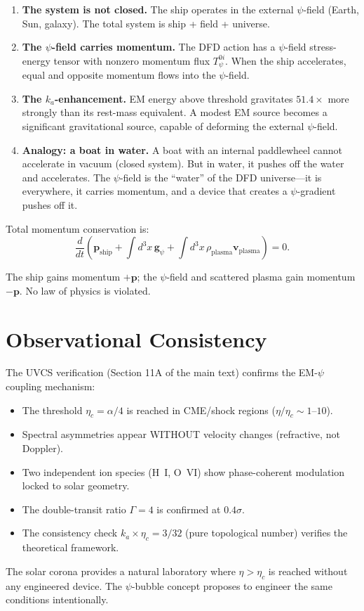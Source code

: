 \documentclass[12pt, letterpaper]{article}
\theoremstyle{definition}
\theoremstyle{remark}
\newcommand{\ka}{k_a}
\newcommand{\etac}{\eta_c}
\begin{document}
\begin{enumerate}
\item \textbf{The system is not closed.} The ship operates in the external
$\psi$-field (Earth, Sun, galaxy). The total system is ship + field + universe.

\item \textbf{The $\psi$-field carries momentum.} The DFD action has a
$\psi$-field stress-energy tensor with nonzero momentum flux $T^{0i}_\psi$.
When the ship accelerates, equal and opposite momentum flows into the
$\psi$-field.

\item \textbf{The $\ka$-enhancement.} EM energy above threshold gravitates
$51.4\times$ more strongly than its rest-mass equivalent. A modest EM
source becomes a significant gravitational source, capable of deforming
the external $\psi$-field.

\item \textbf{Analogy: a boat in water.} A boat with an internal
paddlewheel cannot accelerate in vacuum (closed system). But in water,
it pushes off the water and accelerates. The $\psi$-field is the ``water''
of the DFD universe---it is everywhere, it carries momentum, and a
device that creates a $\psi$-gradient pushes off it.
\end{enumerate}

Total momentum conservation is:
\begin{equation}
\frac{d}{dt}\left(\mathbf{p}_{\mathrm{ship}} + \int d^3x \, \mathbf{g}_\psi
+ \int d^3x \, \rho_{\mathrm{plasma}} \mathbf{v}_{\mathrm{plasma}}\right) = 0.
\end{equation}

The ship gains momentum $+\mathbf{p}$; the $\psi$-field and scattered
plasma gain momentum $-\mathbf{p}$. No law of physics is violated.

\section{Observational Consistency}

The UVCS verification (Section 11A of the main text) confirms the
EM-$\psi$ coupling mechanism:

\begin{itemize}
\item The threshold $\etac = \alpha/4$ is reached in CME/shock regions
($\eta/\etac \sim 1$--$10$).
\item Spectral asymmetries appear WITHOUT velocity changes (refractive,
not Doppler).
\item Two independent ion species (H~I, O~VI) show phase-coherent
modulation locked to solar geometry.
\item The double-transit ratio $\Gamma = 4$ is confirmed at $0.4\sigma$.
\item The consistency check $\ka \times \etac = 3/32$ (pure topological
number) verifies the theoretical framework.
\end{itemize}

The solar corona provides a natural laboratory where $\eta > \etac$ is
reached without any engineered device. The $\psi$-bubble concept proposes
to engineer the same conditions intentionally.
\end{document}
